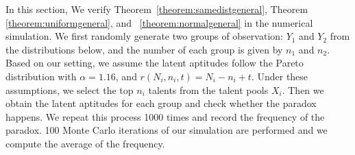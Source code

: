 \documentclass[12pt]{article}
\begin{document}
In this section, We verify Theorem~\ref{theorem:samedistgeneral}, Theorem \ref{theorem:uniformgeneral}, and ~\ref{theorem:normalgeneral} in the numerical simulation. We first randomly generate two groups of observation: $Y_1$ and $Y_2$ from the distributions below, and the number of each group is given by $n_1$ and $n_2$. Based on our setting, we assume the latent aptitudes follow the Pareto distribution with $\alpha = 1.16$,  and $r(N_i, n_i, t) = N_i - n_i + t$. Under these assumptions, we select the top $n_i$ talents from the talent pools $X_i$. Then we obtain the latent aptitudes for each group and check whether the paradox happens. We repeat this process 1000 times and record the frequency of the paradox. 100 Monte Carlo iterations of our simulation are performed and we compute the average of the frequency.  
 
\end{document}
